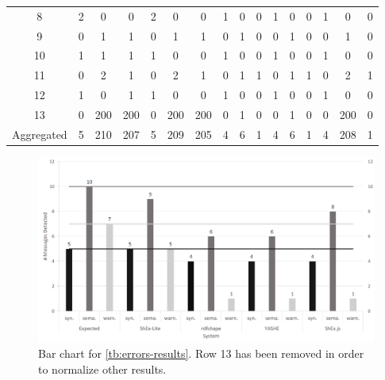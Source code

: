 \begin{table}
{\begin{tabular}{c|ccc|ccc|ccc|ccc|ccc}
    \multicolumn{1}{c|}{8}  & 2       & 0        & 0       & 2       & 0        & 0        & 1       & 0        & 0       & 1       & 0       & 0       & 1       & 0       & 0       \\
    \multicolumn{1}{c|}{9}  & 0       & 1        & 1       & 0       & 1        & 1        & 0       & 1        & 0       & 0       & 1       & 0       & 0       & 1       & 0       \\
    \multicolumn{1}{c|}{10} & 1       & 1        & 1       & 1       & 0        & 0        & 1       & 0        & 0       & 1       & 0       & 0       & 1       & 0       & 0       \\
    \multicolumn{1}{c|}{11} & 0       & 2        & 1       & 0       & 2        & 1        & 0       & 1        & 1       & 0       & 1       & 1       & 0       & 2       & 1       \\
    \multicolumn{1}{c|}{12} & 1       & 0        & 1       & 1       & 0        & 0        & 1       & 0        & 0       & 1       & 0       & 0       & 1       & 0       & 0       \\
    \multicolumn{1}{c|}{13} & 0       & 200      & 200     & 0       & 200      & 200      & 0       & 1        & 0       & 0       & 1       & 0       & 0       & 200     & 0       \\ \hline
    \multicolumn{1}{c|}{Aggregated} & 5       & 210      & 207     & 5       & 209      & 205      & 4       & 6        & 1       & 4       & 6       & 1       & 4       & 208     & 1      
    \end{tabular}}
\end{table}

\begin{figure}
  \includegraphics[width=\textwidth]{images/results-chart.png}
  \centering
  \caption[Bar chart for \cref{tb:errors-results}]{Bar chart for \cref{tb:errors-results}. Row 13 has been removed in order to normalize other results.}
  \label{fig:results-chart}
\end{figure}

